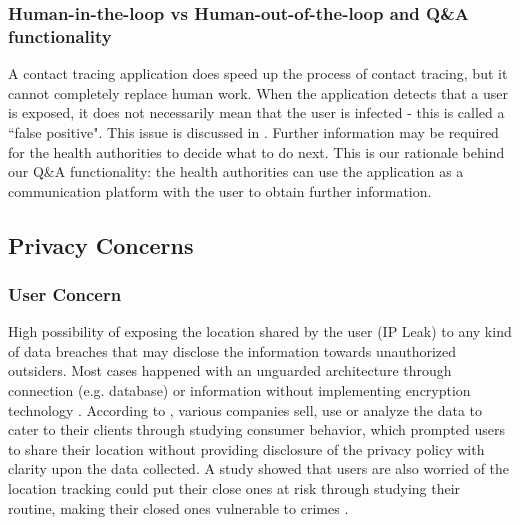   \subsubsection{Human-in-the-loop vs Human-out-of-the-loop and Q\&A functionality}
    \par A contact tracing application does speed up the process of contact tracing, but it cannot completely replace human work. When the application detects that a user is exposed, it does not necessarily mean that the user is infected - this is called a ``false positive". This issue is discussed in \cite{BlueTrace1}. Further information may be required for the health authorities to decide what to do next. This is our rationale behind our Q\&A functionality: the health authorities can use the application as a communication platform with the user to obtain further information.

  \subsection{Privacy Concerns}
    \subsubsection{User Concern}
      \par High possibility of exposing the location shared by the user (IP Leak) to any kind of data breaches that may disclose the information towards unauthorized outsiders. Most cases happened with an unguarded architecture through connection (e.g. database) or information without implementing encryption technology \parencite{Ian1}. According to \textcite{Ian2}, various companies sell, use or analyze the data to cater to their clients through studying consumer behavior, which prompted users to share their location without providing disclosure of the privacy policy with clarity upon the data collected. A study showed that users are also worried of the location tracking could put their close ones at risk through studying their routine, making their closed ones vulnerable to crimes \parencite{Ian3}.

